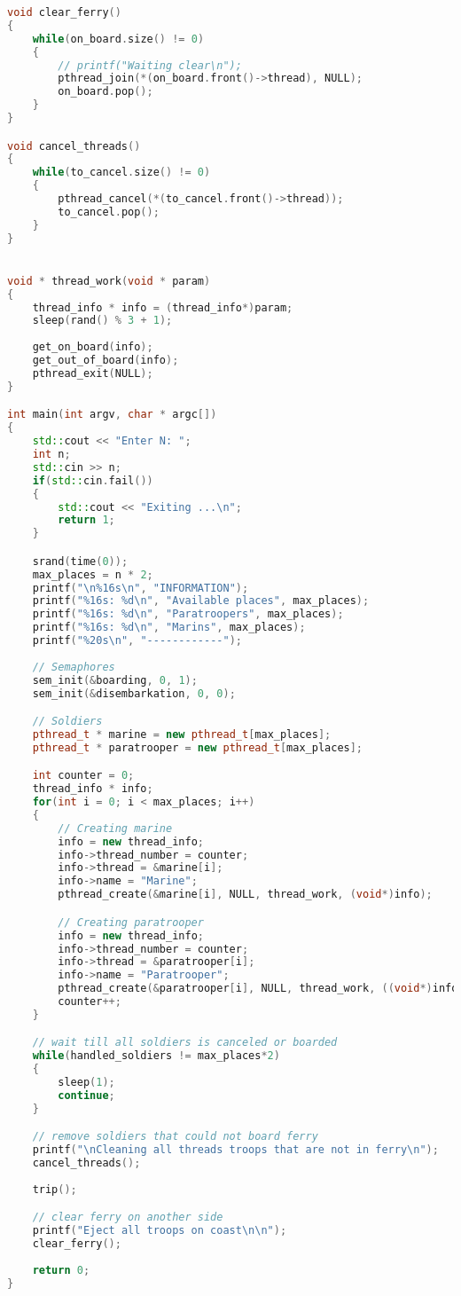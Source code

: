 \documentclass{article}
\begin{document}
\begin{lstlisting}[language=C++]
void clear_ferry()
{
    while(on_board.size() != 0)
    {
        // printf("Waiting clear\n");
        pthread_join(*(on_board.front()->thread), NULL);
        on_board.pop();
    }
}

void cancel_threads()
{
    while(to_cancel.size() != 0)
    {
        pthread_cancel(*(to_cancel.front()->thread));
        to_cancel.pop();
    }
}


void * thread_work(void * param)
{
    thread_info * info = (thread_info*)param;
    sleep(rand() % 3 + 1);
        
    get_on_board(info);
    get_out_of_board(info);
    pthread_exit(NULL);
}

int main(int argv, char * argc[])
{
    std::cout << "Enter N: ";
    int n;
    std::cin >> n;
    if(std::cin.fail())
    {
        std::cout << "Exiting ...\n";
        return 1;
    }

    srand(time(0));
    max_places = n * 2;
    printf("\n%16s\n", "INFORMATION");
    printf("%16s: %d\n", "Available places", max_places);
    printf("%16s: %d\n", "Paratroopers", max_places);
    printf("%16s: %d\n", "Marins", max_places);
    printf("%20s\n", "------------");    
    
    // Semaphores
    sem_init(&boarding, 0, 1);
    sem_init(&disembarkation, 0, 0);

    // Soldiers
    pthread_t * marine = new pthread_t[max_places];
    pthread_t * paratrooper = new pthread_t[max_places];

    int counter = 0;
    thread_info * info;
    for(int i = 0; i < max_places; i++)
    {
        // Creating marine
        info = new thread_info;
        info->thread_number = counter;
        info->thread = &marine[i];
        info->name = "Marine";
        pthread_create(&marine[i], NULL, thread_work, (void*)info);

        // Creating paratrooper
        info = new thread_info;
        info->thread_number = counter;
        info->thread = &paratrooper[i];
        info->name = "Paratrooper";
        pthread_create(&paratrooper[i], NULL, thread_work, ((void*)info));
        counter++;
    }

    // wait till all soldiers is canceled or boarded
    while(handled_soldiers != max_places*2)
    {
        sleep(1);
        continue;
    }

    // remove soldiers that could not board ferry
    printf("\nCleaning all threads troops that are not in ferry\n");
    cancel_threads(); 
    
    trip();

    // clear ferry on another side
    printf("Eject all troops on coast\n\n");
    clear_ferry();
    
    return 0;
}
\end{lstlisting}
\end{document}

